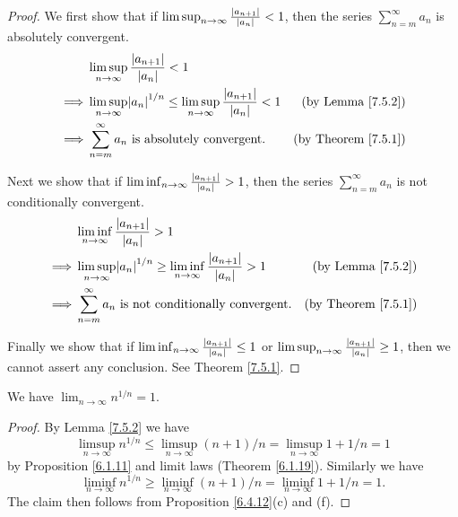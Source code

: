\begin{proof}
    We first show that if \(\limsup_{n \to \infty} \frac{\abs*{a_{n + 1}}}{\abs*{a_n}} < 1\), then the series \(\sum_{n = m}^\infty a_n\) is absolutely convergent.
    \begin{align*}
                 & \limsup_{n \to \infty} \frac{\abs*{a_{n + 1}}}{\abs*{a_n}} < 1                                                                                  \\
        \implies & \limsup_{n \to \infty} \abs*{a_n}^{1 / n} \leq \limsup_{n \to \infty} \frac{\abs*{a_{n + 1}}}{\abs*{a_n}} < 1 & \text{(by Lemma \ref{7.5.2})}   \\
        \implies & \sum_{n = m}^\infty a_n \text{ is absolutely convergent}.                                                     & \text{(by Theorem \ref{7.5.1})}
    \end{align*}

    Next we show that if \(\liminf_{n \to \infty} \frac{\abs*{a_{n + 1}}}{\abs*{a_n}} > 1\), then the series \(\sum_{n = m}^\infty a_n\) is not conditionally convergent.
    \begin{align*}
                 & \liminf_{n \to \infty} \frac{\abs*{a_{n + 1}}}{\abs*{a_n}} > 1                                                                                  \\
        \implies & \limsup_{n \to \infty} \abs*{a_n}^{1 / n} \geq \liminf_{n \to \infty} \frac{\abs*{a_{n + 1}}}{\abs*{a_n}} > 1 & \text{(by Lemma \ref{7.5.2})}   \\
        \implies & \sum_{n = m}^\infty a_n \text{ is not conditionally convergent}.                                              & \text{(by Theorem \ref{7.5.1})}
    \end{align*}

    Finally we show that if \(\liminf_{n \to \infty} \frac{\abs*{a_{n + 1}}}{\abs*{a_n}} \leq 1\) or \(\limsup_{n \to \infty} \frac{\abs*{a_{n + 1}}}{\abs*{a_n}} \geq 1\), then we cannot assert any conclusion.
    See Theorem \ref{7.5.1}.
\end{proof}

\begin{proposition}\label{7.5.4}
    We have \(\lim_{n \to \infty} n^{1 / n} = 1\).
\end{proposition}

\begin{proof}
    By Lemma \ref{7.5.2} we have
    \[
        \limsup_{n \to \infty} n^{1 / n} \leq \limsup_{n \to \infty} (n + 1) / n = \limsup_{n \to \infty} 1 + 1 / n = 1
    \]
    by Proposition \ref{6.1.11} and limit laws (Theorem \ref{6.1.19}).
    Similarly we have
    \[
        \liminf_{n \to \infty} n^{1 / n} \geq \liminf_{n \to \infty} (n + 1) / n = \liminf_{n \to \infty} 1 + 1 / n = 1.
    \]
    The claim then follows from Proposition \ref{6.4.12}(c) and (f).
\end{proof}

